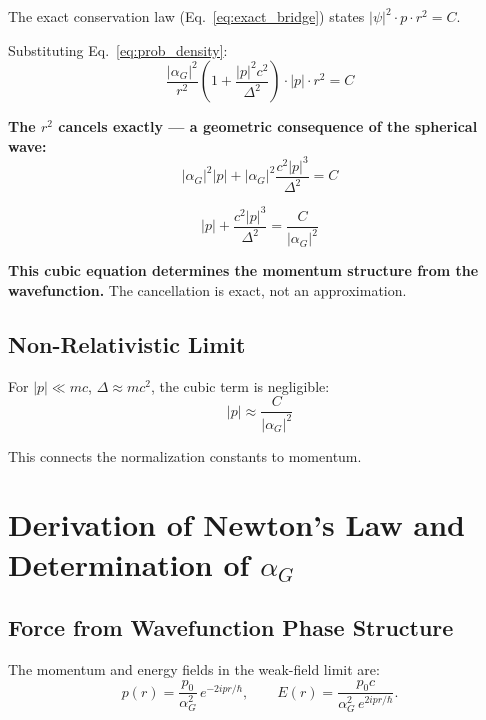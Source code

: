 \documentclass[11pt,a4paper]{article}
\theoremstyle{definition}
\theoremstyle{remark}
\begin{document}
	The exact conservation law (Eq.~\eqref{eq:exact_bridge}) states $|\psi|^2 \cdot p \cdot r^2 = C$.
	
	Substituting Eq.~\eqref{eq:prob_density}:
	\begin{equation}
		\frac{|\alpha_G|^2}{r^2}\!\left(1+\frac{|p|^2 c^2}{\Delta^2}\right)\cdot|p|\cdot r^2 = C
		\label{eq:momentum_equation}
	\end{equation}
	
	\textbf{The $r^2$ cancels exactly --- a geometric consequence of the spherical wave:}
	\begin{equation}
		|\alpha_G|^2|p| + |\alpha_G|^2\frac{c^2|p|^3}{\Delta^2} = C
	\end{equation}
	
	\begin{equation}
		\boxed{|p| + \frac{c^2|p|^3}{\Delta^2} = \frac{C}{|\alpha_G|^2}}
		\label{eq:cubic}
	\end{equation}
	
	\textbf{This cubic equation determines the momentum structure from the wavefunction.}  The cancellation is exact, not an approximation.
	
	\subsection{Non-Relativistic Limit}
	
	For $|p|\ll mc$, $\Delta\approx mc^2$, the cubic term is negligible:
	\begin{equation}
		\boxed{|p| \approx \frac{C}{|\alpha_G|^2}}
		\label{eq:nr_momentum}
	\end{equation}
	
	This connects the normalization constants to momentum.
	
	\section{Derivation of Newton's Law and Determination of $\alpha_G$}
	\label{sec:newton}
	
	\subsection{Force from Wavefunction Phase Structure}
	
	The momentum and energy fields in the weak-field limit are:
	\begin{equation}
		p(r) = \frac{p_0}{\alpha_G^2}\,e^{-2ipr/\hbar}, \qquad
		E(r) = \frac{p_0 c}{\alpha_G^2\,e^{2ipr/\hbar}}.
	\end{equation}
	
\end{document}
